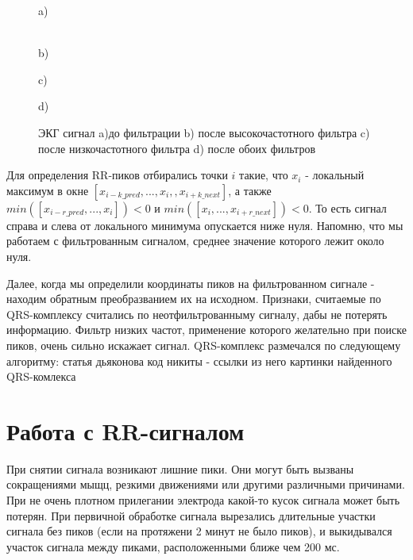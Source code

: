 \begin{figure}[h]
	\begin{minipage}[h]{0.47\linewidth}
		 a) \\
	\end{minipage}
	\hfill
	\begin{minipage}[h]{0.47\linewidth}
		 \\b)
	\end{minipage}
	\vfill
	\begin{minipage}[h]{0.47\linewidth}
		 c) \\
	\end{minipage}
	\hfill
	\begin{minipage}[h]{0.47\linewidth}
		 d) \\
	\end{minipage}
	\caption{ЭКГ сигнал a)до фильтрации b) после высокочастотного фильтра
		c) после низкочастотного фильтра d) после обоих фильтров}
	\label{ris:filter_ekg}
\end{figure}

Для определения RR-пиков отбирались точки $i$ такие, что $x_i$ - локальный максимум в окне $[x_{i-k\_pred}, ..., x_i,    , x_{i+k\_next}]$, а также $min([x_{i-r\_pred}, ..., x_i])<0$ и $min([x_i, ..., x_{i+r\_next}])<0$. То есть сигнал справа и слева от локального минимума опускается ниже нуля. Напомню, что мы работаем с фильтрованным сигналом, среднее значение которого лежит около нуля.

Далее, когда мы определили координаты пиков на фильтрованном сигнале - находим обратным преобразванием их на исходном. Признаки, считаемые по QRS-комплексу считались по неотфильтрованныму сигналу, дабы не потерять информацию. Фильтр низких частот, применение которого желательно при поиске пиков, очень сильно искажает сигнал. 
QRS-комплекс размечался по следующему алгоритму:
статья дьяконова
код никиты - ссылки из него
картинки найденного QRS-комлекса

\section{Работа с RR-сигналом}
При снятии сигнала возникают лишние пики. Они могут быть вызваны сокращениями мыщц, резкими движениями или другими различными причинами. При не очень плотном прилегании электрода какой-то кусок сигнала может быть потерян. При первичной обработке сигнала вырезались длительные участки сигнала без пиков (если на протяжени 2 минут не было пиков), и выкидывался участок сигнала между пиками, расположенными ближе чем 200 мс.


